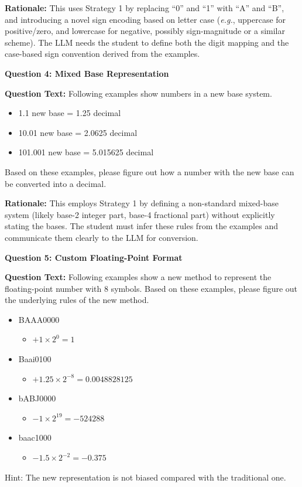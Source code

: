 \documentclass{article} %
\begin{document}
\textbf{Rationale:} This uses Strategy 1 by replacing ``0'' and ``1'' with ``A'' and ``B'', and introducing a novel sign encoding based on letter case ({\em e.g.}, uppercase for positive/zero, and lowercase for negative, possibly sign-magnitude or a similar scheme). The LLM needs the student to define both the digit mapping and the case-based sign convention derived from the examples.

\textbf{Question 4: Mixed Base Representation}

\textbf{Question Text:} Following examples show numbers in a new base system.
\begin{itemize}
    \item 1.1 new base  = 1.25 decimal
    \item 10.01 new base = 2.0625 decimal
    \item 101.001 new base = 5.015625 decimal
\end{itemize}Based on these examples, please figure out how a number with the new base can be converted into a decimal.

\textbf{Rationale:} This employs Strategy 1 by defining a non-standard mixed-base system (likely base-2 integer part, base-4 fractional part) without explicitly stating the bases. The student must infer these rules from the examples and communicate them clearly to the LLM for conversion.

\textbf{Question 5: Custom Floating-Point Format}

\textbf{Question Text:} Following examples show a new method to represent the floating-point number with 8 symbols. Based on these examples, please figure out the underlying rules of the new method.
\begin{itemize}
    \item BAAA0000
    \begin{itemize}
        \item $+1 \times 2^0= 1$
    \end{itemize}
    \item Baai0100
    \begin{itemize}
        \item $+1.25 \times 2^{-8} = 0.0048828125$
    \end{itemize}
    \item bABJ0000
    \begin{itemize}
        \item $-1 \times 2^{19} = -524288$
    \end{itemize}
    \item baac1000
    \begin{itemize}
        \item $-1.5 \times 2^{-2} = -0.375$
    \end{itemize}
\end{itemize}
Hint: The new representation is not biased compared with the traditional one.
\end{document}
